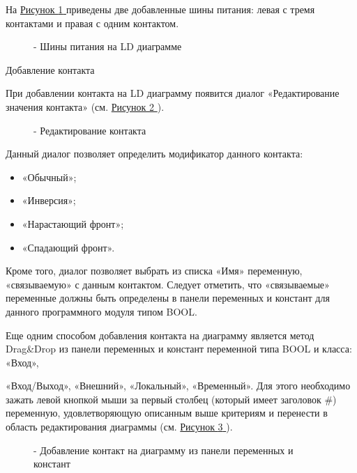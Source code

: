 \documentclass[letterpaper,10pt,russian]{sphinxmanual}
\begin{document}
На \hyperref[usage_guide/ide_components:image77]{Рисунок \ref{usage_guide/ide_components:image77} } приведены две добавленные шины питания: левая с тремя
контактами и правая с одним контактом.
\begin{figure}[htbp]
\centering
\capstart

\noindent{}
\caption{- Шины питания на LD диаграмме}\label{usage_guide/ide_components:image77}\end{figure}

Добавление контакта

При добавлении контакта на LD диаграмму появится диалог «Редактирование
значения контакта» (см. \hyperref[usage_guide/ide_components:image78]{Рисунок \ref{usage_guide/ide_components:image78} }).
\begin{figure}[htbp]
\centering
\capstart

\noindent{}
\caption{- Редактирование контакта}\label{usage_guide/ide_components:image78}\end{figure}

Данный диалог позволяет определить модификатор данного контакта:
\begin{itemize}
\item {} 
«Обычный»;

\item {} 
«Инверсия»;

\item {} 
«Нарастающий фронт»;

\item {} 
«Спадающий фронт».

\end{itemize}

Кроме того, диалог позволяет выбрать из списка «Имя» переменную,
«связываемую» с данным контактом. Следует отметить, что «связываемые»
переменные должны быть определены в панели переменных и констант для
данного программного модуля типом BOOL.

Еще одним способом добавления контакта на диаграмму является метод
Drag\&Drop из панели переменных и констант переменной типа BOOL и класса:
«Вход»,

«Вход/Выход», «Внешний», «Локальный», «Временный». Для этого необходимо
зажать левой кнопкой мыши за первый столбец (который имеет заголовок \#)
переменную, удовлетворяющую описанным выше критериям и перенести в
область редактирования диаграммы (см. \hyperref[usage_guide/ide_components:image79]{Рисунок \ref{usage_guide/ide_components:image79} }).
\begin{figure}[htbp]
\centering
\capstart

\noindent{}
\caption{- Добавление контакт на диаграмму из панели переменных и констант}\label{usage_guide/ide_components:image79}\end{figure}
\end{document}
